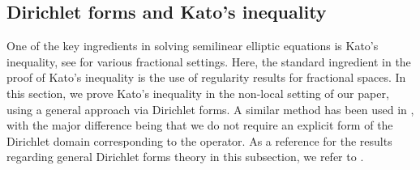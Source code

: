 \documentclass[12pt,a4paper,onecolumn]{article}
\theoremstyle{definition}
\newcommand{\1}{\mathbf 1}
\numberwithin{equation}{section}
\begin{document}
 \subsection{Dirichlet forms and Kato's inequality}
 One of the key ingredients in solving semilinear elliptic equations is Kato's inequality, see \cite{AbaDup-Nonhomog2017,CaffarelliKato,chen_veron,DGcV-Kato,Figalli-DeGiorgi} for various fractional settings. Here, the standard ingredient in the proof of Kato's inequality is the use of regularity results for fractional spaces. In this section, we prove Kato's inequality in the non-local setting of our paper, using a general approach via Dirichlet forms. A similar method has been used in \cite{HuynhNguyen2022}, with the major difference being that we do not require an explicit form of the Dirichlet domain corresponding to the operator. As a reference for the results regarding general Dirichlet forms theory in this subsection, we refer to \cite{FOT}.
 
\end{document}
